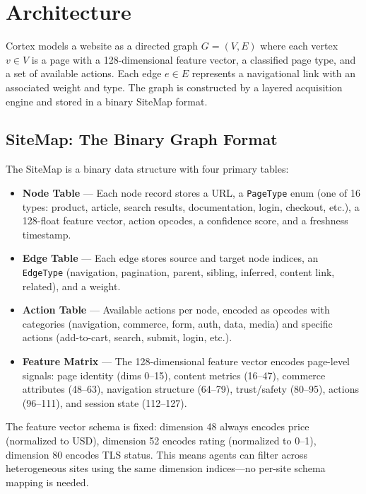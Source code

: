 \documentclass[10pt, twocolumn]{article}
\begin{document}
\section{Architecture}
\label{sec:architecture}

Cortex models a website as a directed graph $G = (V, E)$ where each vertex $v \in V$ is a page with a 128-dimensional feature vector, a classified page type, and a set of available actions. Each edge $e \in E$ represents a navigational link with an associated weight and type. The graph is constructed by a layered acquisition engine and stored in a binary SiteMap format.

\subsection{SiteMap: The Binary Graph Format}
\label{sec:sitemap}

The SiteMap is a binary data structure with four primary tables:

\begin{itemize}[nosep, leftmargin=*]
  \item \textbf{Node Table} --- Each node record stores a URL, a \texttt{PageType} enum (one of 16 types: product, article, search results, documentation, login, checkout, etc.), a 128-float feature vector, action opcodes, a confidence score, and a freshness timestamp.
  \item \textbf{Edge Table} --- Each edge stores source and target node indices, an \texttt{EdgeType} (navigation, pagination, parent, sibling, inferred, content link, related), and a weight.
  \item \textbf{Action Table} --- Available actions per node, encoded as opcodes with categories (navigation, commerce, form, auth, data, media) and specific actions (add-to-cart, search, submit, login, etc.).
  \item \textbf{Feature Matrix} --- The 128-dimensional feature vector encodes page-level signals: page identity (dims 0--15), content metrics (16--47), commerce attributes (48--63), navigation structure (64--79), trust/safety (80--95), actions (96--111), and session state (112--127).
\end{itemize}

The feature vector schema is fixed: dimension 48 always encodes price (normalized to USD), dimension 52 encodes rating (normalized to 0--1), dimension 80 encodes TLS status. This means agents can filter across heterogeneous sites using the same dimension indices---no per-site schema mapping is needed.
\end{document}
